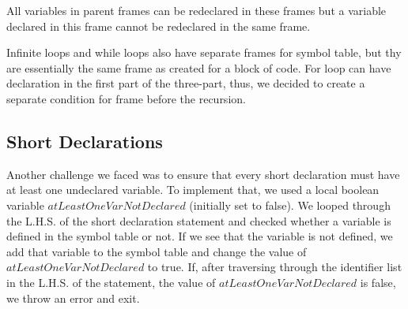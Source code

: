 \documentclass[preprint,12pt]{elsarticle}
\begin{document}
All variables in parent frames can be redeclared in these frames but a variable declared in this frame cannot be redeclared in the same frame.

Infinite loops and while loops also have separate frames for symbol table, but thy are essentially the same frame as created for a block of code. For loop can have declaration in the first part of the three-part, thus, we decided to create a separate condition for frame before the recursion.

\subsection{Short Declarations}

Another challenge we faced was to ensure that every short declaration must have at least one undeclared variable. To implement that, we used a local boolean variable $atLeastOneVarNotDeclared$ (initially set to false). We looped through the L.H.S. of the short declaration statement and checked whether a variable is defined in the symbol table or not. If we see that the variable is not defined, we add that variable to the symbol table and change the value of $atLeastOneVarNotDeclared$ to true. If, after traversing through the identifier list in the L.H.S. of the statement, the value of $atLeastOneVarNotDeclared$ is false, we throw an error and exit.







\end{document}
